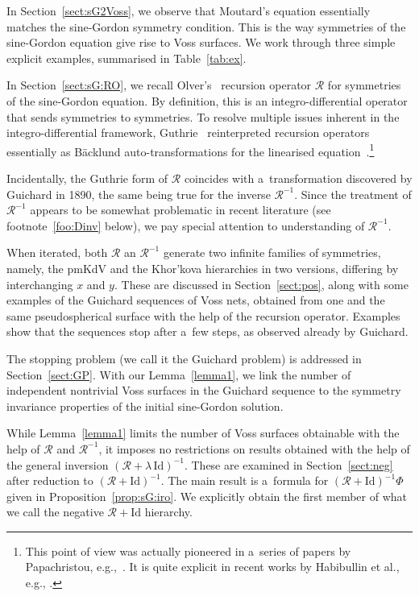 \documentclass[pdftex]{sigma}
\def\RO{{\mathcal R}}
\numberwithin{equation}{section}
\theoremstyle{definition}
\begin{document}
In Section~\ref{sect:sG2Voss}, we observe that Moutard's equation
essentially matches the sine-Gordon symmetry condition.
This is the way symmetries of the sine-Gordon equation give rise to Voss
surfaces.
We work through three simple explicit examples, summarised in
Table~\ref{tab:ex}.

In Section~\ref{sect:sG:RO}, we recall Olver's~\cite{PJO-1977}
recursion operator $\RO$ for symmetries of the sine-Gordon equation.
By definition, this is an integro-differential operator that sends
symmetries to symmetries.
To resolve multiple issues inherent in the integro-differential framework,
Guthrie~\cite{GAG-1993,GAG-1994} reinterpreted recursion operators
essentially as B\"acklund auto-transformations for the linearised
equation~\cite{MM-alro}.\footnote{This point of view was actually pioneered in a~series of papers by
Papachristou, e.g.,~\cite{CJP-1991}.
It is quite explicit in recent works by Habibullin et al., e.g.,
\cite{H-Kh-P-2016}.}

Incidentally, the Guthrie form of $\RO$ coincides with a~transformation discovered by Guichard in 1890,
the same being true for the inverse $\RO^{-1}$.
Since the treatment of $\RO^{-1}$ appears to be somewhat
problematic in recent literature
(see footnote~\ref{foo:Dinv} below),
we pay special attention to understanding of $\RO^{-1}$.

When iterated, both $\RO$ an $\RO^{-1}$ generate two infinite families of
symmetries, namely, the pmKdV and the Khor'kova hierarchies
in two versions, differing by interchanging $x$ and $y$.
These are discussed in Section~\ref{sect:pos}, along with some examples
of the Guichard sequences of Voss nets, obtained from one and the same
pseudospherical surface with the help of the recursion operator.
Examples show that the sequences stop after a~few steps,
as observed already by Guichard.

The stopping problem (we call it the Guichard problem) is addressed in
Section~\ref{sect:GP}.
With our Lemma~\ref{lemma1}, we link the number of independent
nontrivial Voss surfaces in the Guichard sequence to the symmetry
invariance properties of the initial sine-Gordon solution.

While Lemma~\ref{lemma1} limits the number of Voss
surfaces obtainable with the help of $\RO$ and $\RO^{-1}$,
it imposes no restrictions on results obtained with the help of the
general inversion $(\RO + \lambda\,\mathrm{Id})^{-1}$.
These are examined in Section~\ref{sect:neg} after reduction to
$(\RO + \mathrm{Id})^{-1}$.
The main result is a~formula for
$(\RO + \mathrm{Id})^{-1} \Phi$
 given in
Proposition~\ref{prop:sG:iro}.
We explicitly obtain the first member of what we call the negative
$\RO + \mathrm{Id}$ hierarchy.
\end{document}
